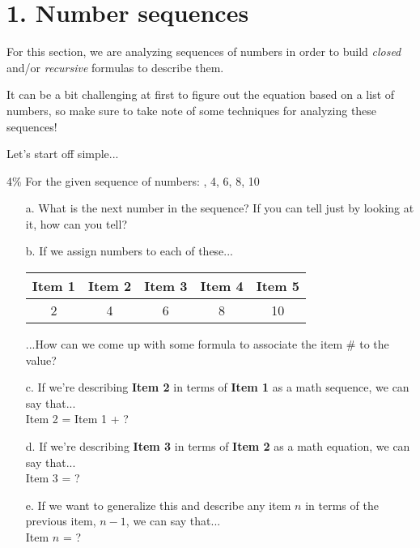 \documentclass[a4paper,12pt]{book}
\begin{document}
    \section*{1. Number sequences}

        \begin{introNOHEAD}
            For this section, we are analyzing sequences of numbers in order to build
            \textit{closed} and/or \textit{recursive} formulas to describe them.

            It can be a bit challenging at first to figure out the equation based
            on a list of numbers, so make sure to take note of some techniques for analyzing
            these sequences!

            Let's start off simple...
        \end{introNOHEAD}

        \begin{question}{1}{4\%}
            For the given sequence of numbers: , 4, 6, 8, 10
        \end{question}

        \begin{enumerate}
            \item[a.] What is the next number in the sequence?  If you can tell just by looking at it, how can you tell?

            \item[b.] If we assign numbers to each of these...

            \begin{center}
                \begin{tabular}{ | c | c | c | c | c | }
                    \hline{}
                    Item 1 & Item 2 & Item 3 & Item 4 & Item 5 \\ \hline
                    2 & 4 & 6 & 8 & 10 \\ \hline
                \end{tabular}
            \end{center}

            ...How can we come up with some formula to associate the item \# to the value?

            \item[c.] If we're describing \textbf{Item 2} in terms of \textbf{Item 1} as
                a math sequence, we can say that... \\
                Item 2 = Item 1 + ?

            \item[d.] If we're describing \textbf{Item 3} in terms of \textbf{Item 2} as a math
                equation, we can say that... \\
                Item 3 = ?

            \item[e.] If we want to generalize this and describe any item $n$ in terms of
                the previous item, $n-1$, we can say that... \\
                Item $n$ = ?
        \end{enumerate}
\end{document}
